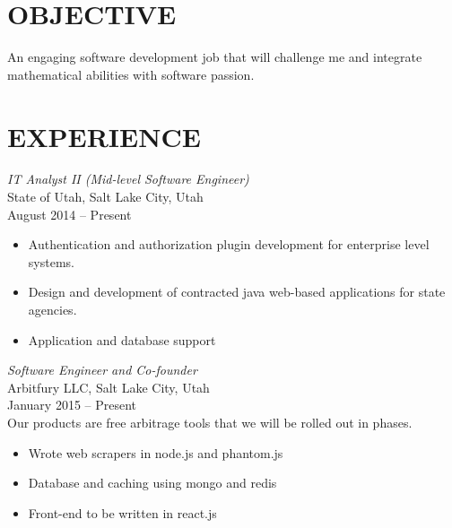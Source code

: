 \documentclass[11pt]{res} %
\begin{document}
 
 

\address{{\bf ADDRESS} \\   759 N Riverside Dr. \\   SLC, UT
         84116   \\ (801) 318-4821}
\address{{\bf ONLINE} \\ earl.lucas@gmail.com \\ github.com/lucqui \\ @LucasTEarl 
\\ linkedin.com/in/lucasearl}
 
                                             
\begin{resume}
                                               
 
\section{OBJECTIVE}
   An engaging software development job that will challenge me and integrate mathematical abilities with software passion.
 
\section{EXPERIENCE} 
{ \it IT Analyst II (Mid-level Software Engineer)}\\
State of Utah, Salt Lake City, Utah \\
August 2014 -- Present \\
\vspace{-0.18in}
   \begin{itemize} \itemsep -2pt  %
   \item Authentication and authorization plugin development for enterprise level systems. 
   \item Design and development of contracted java web-based applications for state agencies.
   \item Application and database support 
 \end{itemize}

{\it Software Engineer and Co-founder} \\
Arbitfury LLC, Salt Lake City, Utah \\ 
January 2015 -- Present 
\vspace{0.05in}\\
Our products are free arbitrage tools that we will be rolled out in phases. \\
\vspace{-0.14in}
 \begin{itemize} \itemsep -2pt
   \item Wrote web scrapers in node.js and phantom.js
  \item  Database and caching using mongo and redis
  \item Front-end to be written in react.js 
\end{itemize} 


\end{resume}
\end{document}
